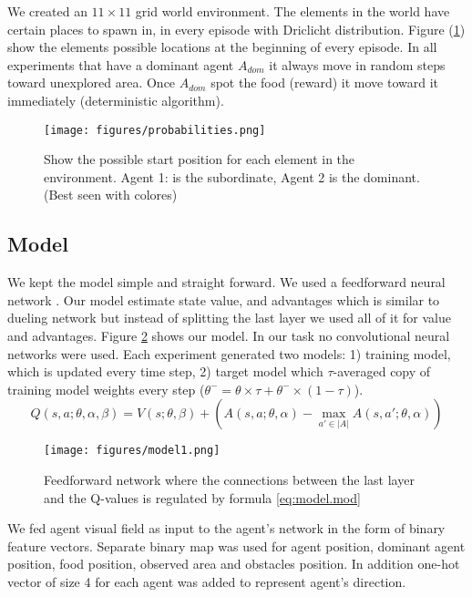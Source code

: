 \documentclass{article}
\begin{document}
We created an $11\times11$ grid world environment. The elements in the world have certain places to spawn in, in every episode with Driclicht distribution. Figure (\ref{fig:probabilities}) show the elements possible locations at the beginning of every episode. In all experiments that have a dominant agent \(A_{dom}\) it always move in random steps toward unexplored area. Once \(A_{dom}\) spot the food (reward) it move toward it immediately (deterministic algorithm).
\begin{figure}[H]
    \centering
    \texttt{[image: figures/probabilities.png]}
    \caption{Show the possible start position for each element in the environment. Agent 1: is the subordinate, Agent 2 is the dominant.(Best seen with colores)}
    \label{fig:probabilities}
\end{figure}

\subsection{Model}\label{model}
We kept the model simple and straight forward. We used a feedforward neural network \cite{Goodfellow-et-al-2016}. Our model estimate state value, and advantages which is similar to dueling network \cite{DBLP:journals/corr/WangFL15} but instead of splitting the last layer we used all of it for value and advantages. Figure \ref{fig.model} shows our model. In our task no convolutional neural networks were used. Each experiment generated two models: 1) training model, which is updated every time step, 2) target model which $\tau$-averaged copy of training model weights every step (\(\theta^{-} = \theta \times \tau + \theta^{-} \times (1-\tau)\)).
  \begin{equation} \label{eq:model.mod}
    Q(s,a;\theta,\alpha,\beta) = V(s;\theta,\beta) +\left( A(s,a;\theta,\alpha) - \underset{a' \in |A|}{\max}A(s,a';\theta,\alpha) \right)
  \end{equation}
\begin{figure}[!ht]
\begin{center}
\texttt{[image: figures/model1.png]}
\caption{Feedforward network where the connections between the last layer and the Q-values is regulated by formula \ref{eq:model.mod}}
\label{fig.model}
\end{center}
\end{figure}

 \par We fed \label{network.input} agent visual field as input to the agent's network in the form of binary feature vectors. Separate binary map was used for agent position, dominant agent position, food position, observed area and obstacles position. In addition one-hot vector of size 4 for each agent was added to represent agent's direction.
\end{document}
